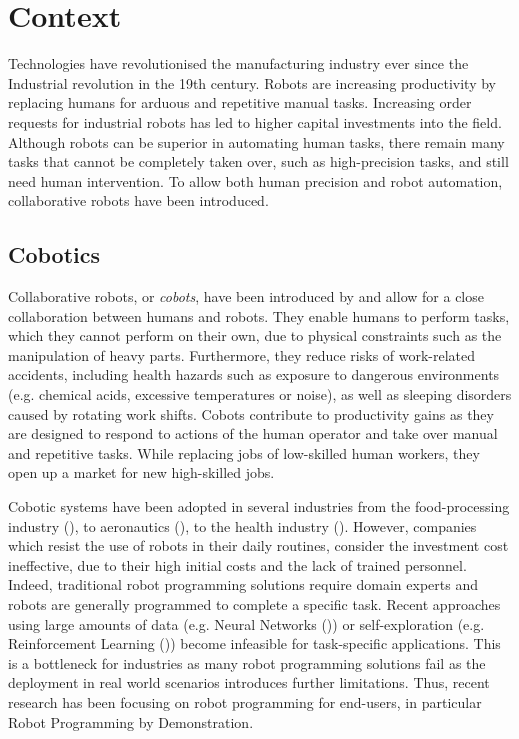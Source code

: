 \section{Context}
Technologies have revolutionised the manufacturing industry ever since the Industrial revolution in the 19th century.
Robots are increasing productivity by replacing humans for arduous and repetitive manual tasks.
Increasing order requests for industrial robots has led to higher capital investments into the field.
Although robots can be superior in automating human tasks, there remain many tasks that cannot be completely taken over, such as high-precision tasks, and still need human intervention.
To allow both human precision and robot automation, collaborative robots have been introduced.

\subsection{Cobotics}\label{subsec:Cobotics}
Collaborative robots, or \textit{cobots}, have been introduced by \cite{colgate1999cobots} and allow for a close collaboration between humans and robots.
They enable humans to perform tasks, which they cannot perform on their own, due to physical constraints such as the manipulation of heavy parts.
Furthermore, they reduce risks of work-related accidents, including health hazards such as exposure to dangerous environments (e.g. chemical acids, excessive temperatures or noise), as well as sleeping disorders caused by rotating work shifts.
Cobots contribute to productivity gains as they are designed to respond to actions of the human operator and take over manual and repetitive tasks.
While replacing jobs of low-skilled human workers, they open up a market for new high-skilled jobs.

Cobotic systems have been adopted in several industries from the food-processing industry (\cite{Food}), to aeronautics (\cite{Airbus}), to the health industry (\cite{Ebola}).
However, companies which resist the use of robots in their daily routines, consider the investment cost ineffective, due to their high initial costs and the lack of trained personnel.
Indeed, traditional robot programming solutions require domain experts and robots are generally programmed to complete a specific task.
Recent approaches using large amounts of data (e.g. Neural Networks (\cite{billard2001robust})) or self-exploration (e.g. Reinforcement Learning (\cite{smart2002effective})) become infeasible for task-specific applications.
This is a bottleneck for industries as many robot programming solutions fail as the deployment in real world scenarios introduces further limitations. 
Thus, recent research has been focusing on robot programming for end-users, in particular Robot Programming by Demonstration.


